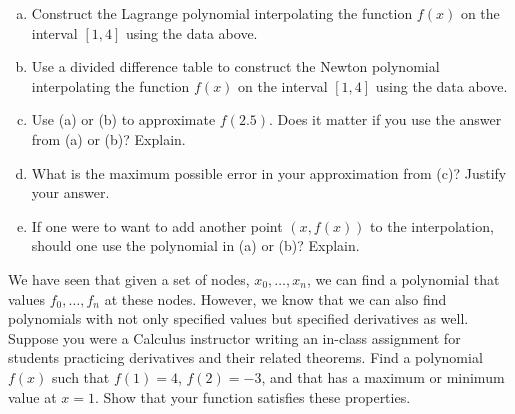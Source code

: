 \documentclass[11pt,letterpaper]{article}
\begin{document}
\begin{enumerate}[(a)]
\item Construct the Lagrange polynomial interpolating the function $f(x)$ on the interval $[1, 4]$ using the data above. 
\item Use a divided difference table to construct the Newton polynomial interpolating the function $f(x)$ on the interval $[1, 4]$ using the data above. 
\item Use (a) or (b) to approximate $f(2.5)$. Does it matter if you use the answer from (a) or (b)? Explain.
\item What is the maximum possible error in your approximation from (c)? Justify your answer. 
\item If one were to want to add another point $(x, f(x))$ to the interpolation, should one use the polynomial in (a) or (b)? Explain. 
\end{enumerate}



\newpage



 We have seen that given a set of nodes, $x_0, \ldots, x_n$, we can find a polynomial that values $f_0, \ldots, f_n$ at these nodes. However, we know that we can also find polynomials with not only specified values but specified derivatives as well. Suppose you were a Calculus instructor writing an in-class assignment for students practicing derivatives and their related theorems. Find a polynomial $f(x)$ such that $f(1)= 4$, $f(2)= -3$, and that has a maximum or minimum value at $x= 1$. Show that your function satisfies these properties. 



\newpage
\end{document}
